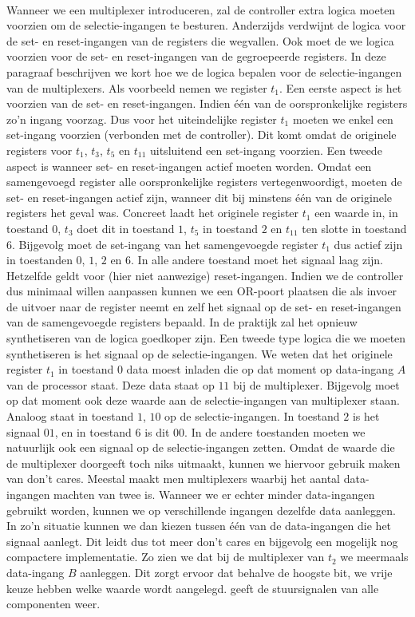 \paragraph{}
Wanneer we een multiplexer introduceren, zal de controller extra logica moeten voorzien om de selectie-ingangen te besturen. Anderzijds verdwijnt de logica voor de set- en reset-ingangen van de registers die wegvallen. Ook moet de we logica voorzien voor de set- en reset-ingangen van de gegroepeerde registers. In deze paragraaf beschrijven we kort hoe we de logica bepalen voor de selectie-ingangen van de multiplexers. Als voorbeeld nemen we register $t_1$. Een eerste aspect is het voorzien van de set- en reset-ingangen. Indien \'e\'en van de oorspronkelijke registers zo'n ingang voorzag. Dus voor het uiteindelijke register $t_1$ moeten we enkel een set-ingang voorzien (verbonden met de controller). Dit komt omdat de originele registers voor $t_1$, $t_3$, $t_5$ en $t_{11}$ uitsluitend een set-ingang voorzien. Een tweede aspect is wanneer set- en reset-ingangen actief moeten worden. Omdat een samengevoegd register alle oorspronkelijke registers vertegenwoordigt, moeten de set- en reset-ingangen actief zijn, wanneer dit bij minstens \'e\'en van de originele registers het geval was. Concreet laadt het originele register $t_1$ een waarde in, in toestand $0$, $t_3$ doet dit in toestand $1$, $t_5$ in toestand $2$ en $t_{11}$ ten slotte in toestand $6$. Bijgevolg moet de set-ingang van het samengevoegde register $t_1$ dus actief zijn in toestanden $0$, $1$, $2$ en $6$. In alle andere toestand moet het signaal laag zijn. Hetzelfde geldt voor (hier niet aanwezige) reset-ingangen. Indien we de controller dus minimaal willen aanpassen kunnen we een OR-poort plaatsen die als invoer de uitvoer naar de register neemt en zelf het signaal op de set- en reset-ingangen van de samengevoegde registers bepaald. In de praktijk zal het opnieuw synthetiseren van de logica goedkoper zijn. Een tweede type logica die we moeten synthetiseren is het signaal op de selectie-ingangen. We weten dat het originele register $t_1$ in toestand $0$ data moest inladen die op dat moment op data-ingang $A$ van de processor staat. Deze data staat op $11$ bij de multiplexer. Bijgevolg moet op dat moment ook deze waarde aan de selectie-ingangen van multiplexer staan. Analoog staat in toestand $1$, $10$ op de selectie-ingangen. In toestand $2$ is het signaal $01$, en in toestand $6$ is dit $00$. In de andere toestanden moeten we natuurlijk ook een signaal op de selectie-ingangen zetten. Omdat de waarde die de multiplexer doorgeeft toch niks uitmaakt, kunnen we hiervoor gebruik maken van don't cares. Meestal maakt men multiplexers waarbij het aantal data-ingangen machten van twee is. Wanneer we er echter minder data-ingangen gebruikt worden, kunnen we op verschillende ingangen dezelfde data aanleggen. In zo'n situatie kunnen we dan kiezen tussen \'e\'en van de data-ingangen die het signaal aanlegt. Dit leidt dus tot meer don't cares en bijgevolg een mogelijk nog compactere implementatie. Zo zien we dat bij de multiplexer van $t_2$ we meermaals data-ingang $B$ aanleggen. Dit zorgt ervoor dat behalve de hoogste bit, we vrije keuze hebben welke waarde wordt aangelegd.  geeft de stuursignalen van alle componenten weer.

